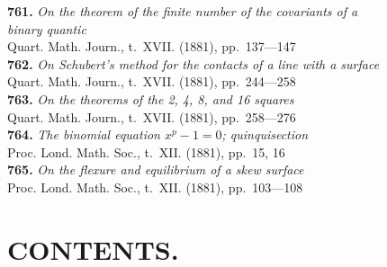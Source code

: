 \documentclass[12pt,a4paper,oneside]{book}
\theoremstyle{plain}
\theoremstyle{definition}
\theoremstyle{remark}
\begin{document}
\textbf{761.} \textit{On the theorem of the finite number of the covariants of a}\\
\hspace*{2em}\textit{binary quantic} \\
\hspace*{2em}Quart. Math. Journ., t.~XVII. (1881), pp.~137---147\\[0.3em]
\textbf{762.} \textit{On Schubert's method for the contacts of a line with a surface} \\
\hspace*{2em}Quart. Math. Journ., t.~XVII. (1881), pp.~244---258\\[0.3em]
\textbf{763.} \textit{On the theorems of the 2, 4, 8, and 16 squares} \\
\hspace*{2em}Quart. Math. Journ., t.~XVII. (1881), pp.~258---276\\[0.3em]
\textbf{764.} \textit{The binomial equation $x^p - 1 = 0$; quinquisection} \\
\hspace*{2em}Proc. Lond. Math. Soc., t.~XII. (1881), pp.~15, 16\\[0.3em]
\textbf{765.} \textit{On the flexure and equilibrium of a skew surface} \\
\hspace*{2em}Proc. Lond. Math. Soc., t.~XII. (1881), pp.~103---108

\cleardoublepage

\chapter*{CONTENTS.}
\end{document}
